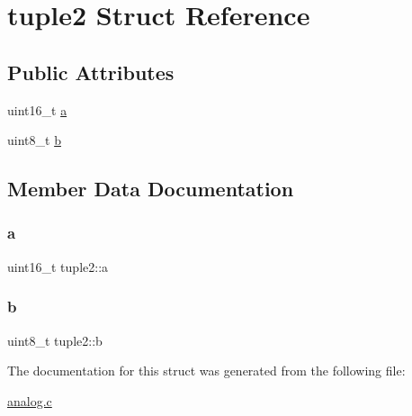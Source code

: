 \hypertarget{structtuple2}{}\section{tuple2 Struct Reference}
\label{structtuple2}
\subsection*{Public Attributes}
\begin{DoxyCompactItemize}
\item 
uint16\+\_\+t \mbox{\hyperlink{structtuple2_aa3206439eea7c8ca52aadf8ec007f9b6}{a}}
\item 
uint8\+\_\+t \mbox{\hyperlink{structtuple2_aea2adbb3a86c5c3527e6aecaf84d55ff}{b}}
\end{DoxyCompactItemize}


\subsection{Member Data Documentation}
\mbox{\label{structtuple2_aa3206439eea7c8ca52aadf8ec007f9b6}} 
\subsubsection{\texorpdfstring{a}{a}}
{\footnotesize\ttfamily uint16\+\_\+t tuple2\+::a}

\mbox{\label{structtuple2_aea2adbb3a86c5c3527e6aecaf84d55ff}} 
\subsubsection{\texorpdfstring{b}{b}}
{\footnotesize\ttfamily uint8\+\_\+t tuple2\+::b}



The documentation for this struct was generated from the following file\+:\begin{DoxyCompactItemize}
\item 
\mbox{\hyperlink{analog_8c}{analog.\+c}}\end{DoxyCompactItemize}
